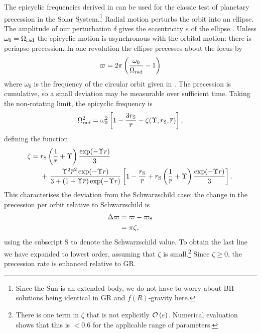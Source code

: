 The epicyclic frequencies derived in  can be used for the classic test of planetary precession in the Solar System.\footnote{Since the Sun is an extended body, we do not have to worry about BH solutions being identical in GR and $f(R)$-gravity here.} Radial motion perturbs the orbit into an ellipse. The amplitude of our perturbation $\delta$ gives the eccentricity $e$ of the ellipse \citep{Kerner2001aJr}. Unless $\omega_0 = \Omega_\mathrm{rad}$ the epicyclic motion is asynchronous with the orbital motion: there is periapse precession. In one revolution the ellipse precesses about the focus by
\begin{equation}
\varpi = 2\pi\left(\dfrac{\omega_0}{\Omega_\mathrm{rad}} - 1\right)
\end{equation}
where $\omega_0$ is the frequency of the circular orbit given in . The precession is cumulative, so a small deviation may be measurable over sufficient time. Taking the non-rotating limit, the epicyclic frequency is
\begin{equation}
\Omega_\mathrm{rad}^2 = \omega_0^2 \left[1 - \dfrac{3r_\mathrm{S}}{\overline{r}} - \zeta(\Upsilon,r_\mathrm{S},\overline{r})\right],
\end{equation}
defining the function
\begin{align}
\zeta = {} & r\sub{S}\left(\recip{\overline{r}} + \Upsilon\right)\dfrac{\exp(-\Upsilon r)}{3} \nonumber\\* %
 {} & + \left. \dfrac{\Upsilon^2\overline{r}^2\exp(-\Upsilon r)}{3 + (1 + \Upsilon \overline{r})\exp(-\Upsilon r)} \left[1 - \dfrac{r\sub{S}}{\overline{r}} + r\sub{S}\left(\recip{\overline{r}} + \Upsilon\right)\dfrac{\exp(-\Upsilon r)}{3}\right].\right.
\end{align}
This characterises the deviation from the Schwarzschild case: the change in the precession per orbit relative to Schwarzschild is
\begin{align}
\Delta \varpi = {} & \varpi - \varpi_\mathrm{S} \\
 = {} & \pi\zeta,
\end{align}
using the subscript $\text{S}$ to denote the Schwarzschild value. To obtain the last line we have expanded to lowest order, assuming that $\zeta$ is small.\footnote{There is one term in $\zeta$ that is not explicitly $\mathcal{O}\left({\varepsilon}\right)$. Numerical evaluation shows that this is $< 0.6$ for the applicable range of parameters.} Since $\zeta \geq 0$, the precession rate is enhanced relative to GR.

